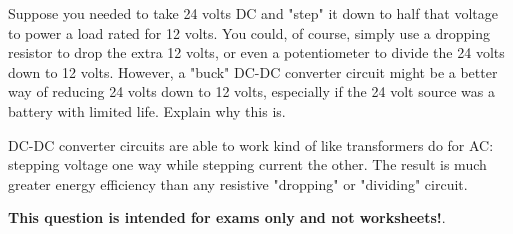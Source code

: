 

Suppose you needed to take 24 volts DC and "step" it down to half that voltage to power a load rated for 12 volts.  You could, of course, simply use a dropping resistor to drop the extra 12 volts, or even a potentiometer to divide the 24 volts down to 12 volts.  However, a "buck" DC-DC converter circuit might be a better way of reducing 24 volts down to 12 volts, especially if the 24 volt source was a battery with limited life.  Explain why this is.







DC-DC converter circuits are able to work kind of like transformers do for AC: stepping voltage one way while stepping current the other.  The result is much greater energy efficiency than any resistive "dropping" or "dividing" circuit.







{\bf This question is intended for exams only and not worksheets!}.



